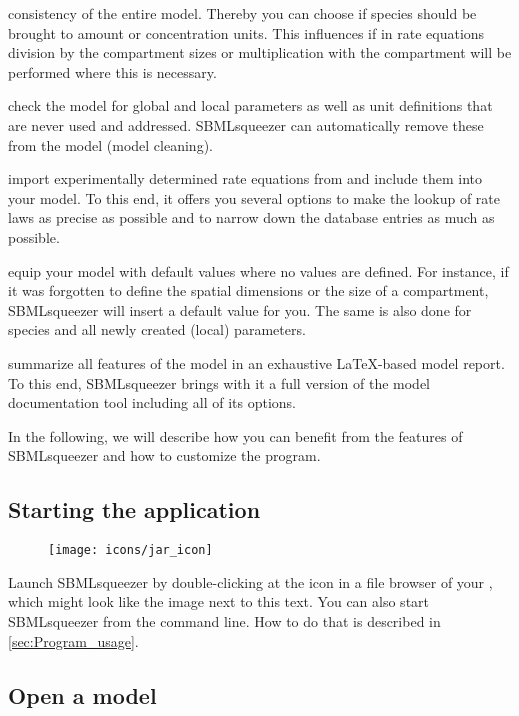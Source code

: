 \begin{dinglist}{52}
  consistency of the entire model. Thereby you can choose if species should be brought
  to amount or concentration units. This influences if in rate equations division by
  the compartment sizes or multiplication with the compartment will be performed where
  this is necessary.
\item check the model for global and local parameters as well as unit definitions
  that are never used and addressed. SBMLsqueezer can automatically remove these from
  the model (model cleaning).
\item import experimentally determined rate equations from \SABIO and include them into
  your model. To this end, it offers you several options to make the lookup of rate laws
  as precise as possible and to narrow down the database entries as much as possible.
\item equip your model with default values where no values are defined. For instance,
  if it was forgotten to define the spatial dimensions or the size of a compartment,
  SBMLsqueezer will insert a default value for you. The same is also done for species
  and all newly created (local) parameters.
\item summarize all features of the model in an exhaustive \LaTeX-based model report.
  To this end, SBMLsqueezer brings with it a full version of the model documentation
  tool \SBMLLaTeX including all of its options.
\end{dinglist}
In the following, we will describe how you can benefit from the features of SBMLsqueezer
and how to customize the program.

\subsection{Starting the application}

\begin{wrapfigure}{O}{.9cm}
\vspace{\wrapfigspace}
\texttt{[image: icons/jar\_icon]}
\end{wrapfigure}
Launch SBMLsqueezer by double-clicking at the \Java icon in a file browser of
your \OS, which might look like the image next to this text.
You can also start SBMLsqueezer from the command line.
How to do that is described in \vref{sec:Program_usage}.

\subsection{Open a model}

